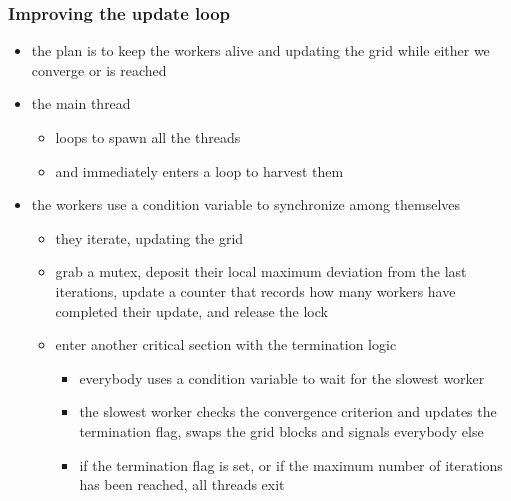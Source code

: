 %
%
%
%


\begin{frame}[fragile]
%
  \frametitle{Improving the update loop}
%
  \begin{itemize}
%
  \item the plan is to keep the workers alive and updating the grid while either we converge or
     is reached
  \item the main thread
    \begin{itemize}
    \item loops to spawn all the threads
    \item and immediately enters a loop to harvest them
    \end{itemize}
%
  \item the workers use a condition variable to synchronize among themselves
    \begin{itemize}
    \item they iterate, updating the grid
    \item grab a mutex, deposit their local maximum deviation from the last iterations, update
      a counter that records how many workers have completed their update, and release the lock
    \item enter another critical section with the termination logic
      \begin{itemize}
      \item everybody uses a condition variable to wait for the slowest worker
      \item the slowest worker checks the convergence criterion and updates the termination
        flag, swaps the grid blocks and signals everybody else
      \item if the termination flag is set, or if the maximum number of iterations has been
        reached, all threads exit
      \end{itemize}
    \end{itemize}
%
  \end{itemize}
%
\end{frame}

